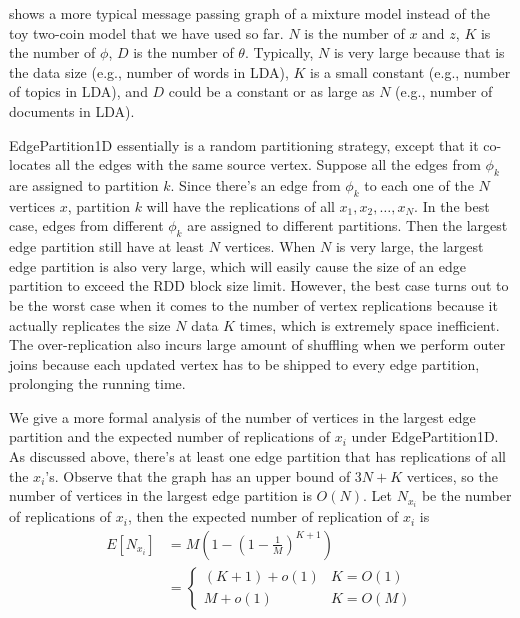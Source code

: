  shows a more typical message passing graph of a
mixture model instead of the toy two-coin model that we have used so far. $N$
is the number of $x$ and $z$, $K$ is the number of $\phi$, $D$ is the number
of $\theta$. Typically, $N$ is very large because that is the data size (e.g.,
number of words in LDA), $K$ is a small constant (e.g., number of topics in
LDA), and $D$ could be a constant or as large as $N$ (e.g., number of
documents in LDA). 


EdgePartition1D essentially is a random partitioning strategy, except that it
co-locates all the edges with the same source vertex. Suppose all the edges from
$\phi_k$ are assigned to partition $k$. Since there's an edge from $\phi_k$ to
each one of the $N$ vertices $x$, partition $k$ will have the replications
of all $x_1, x_2, \ldots, x_N$. In the best case, 
edges from different $\phi_k$ are assigned to different
partitions. Then the largest edge partition still have at least $N$ vertices.
When $N$ is very large, the largest edge partition is also very large, which
will easily cause the size of an edge partition to exceed the RDD block size limit. However,
the best case turns out to be the worst case 
when it comes to the number of vertex replications
because it actually replicates the size $N$ data $K$ times, which is
extremely space inefficient. The over-replication also incurs large amount of
shuffling when we perform outer joins because each updated vertex has to
be shipped to every edge partition, prolonging the running time. 

We give a more formal analysis of the number of vertices in the largest edge
partition and the expected number of replications of $x_i$ under
EdgePartition1D. As discussed above, there's at least one edge partition that
has replications of all the $x_i$'s. 
Observe that the graph has an upper bound of
$3N + K$ vertices, so the number of vertices in the largest edge partition is
$O(N)$. Let $N_{x_i}$ be the number of replications of $x_i$, then the expected
number of replication of $x_i$ is 
\begin{align*}
	E[N_{x_i}] &= M(1 - (1 - \frac{1}{M})^{K+1}) \\
		&= \left\{
			\begin{array}{ll}
				(K + 1) + o(1) & K = O(1) \\
				M + o(1) & K = O(M) 
			\end{array}
		\right.%
\end{align*}



